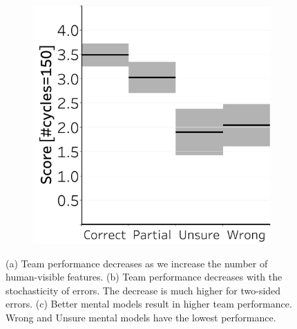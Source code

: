 \documentclass[letterpaper]{article} %
\newcommand{\?}{\mbox{?}}
\begin{document}
\begin{figure}[t]
\begin{subfigure}[b]{.47\columnwidth}
    \caption{}
    \label{fig:complexity_stochastic}
  \end{subfigure}
    \hfill
  \begin{subfigure}[b]{0.47\columnwidth}
  \centering
    \centering
    \includegraphics[width=\columnwidth]{wsl.pdf}
    \caption{}
    \label{fig:wsl}
  \end{subfigure}
  
  \caption{(a) Team performance decreases as we increase the number of human-visible features. (b) Team performance decreases with the stochasticity of errors. The decrease is much higher for two-sided errors. (c) Better mental models result in higher team performance. Wrong and Unsure mental models have the lowest performance. 
  }
  \label{fig:complexity}
\end{figure}
\end{document}
